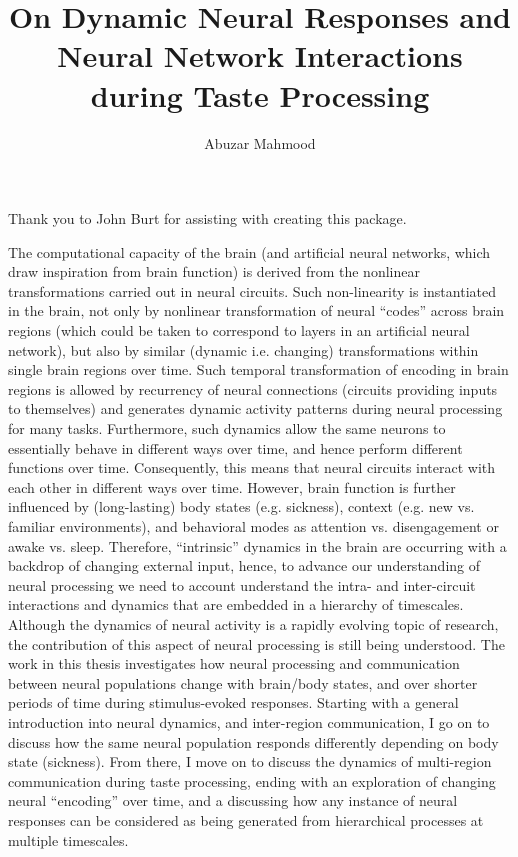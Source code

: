 \documentclass{brandeis-dissertation3.12}
\title{On Dynamic Neural Responses and Neural Network Interactions during Taste Processing}
\author{Abuzar Mahmood}
\begin{document}
\maketitlepage
\makeapproval
\makecopyright

\begin{dissertation-acknowledgements}
Thank you to John Burt for assisting with creating this package.
\end{dissertation-acknowledgements}

\begin{dissertation-abstract}
The computational capacity of the brain (and artificial neural networks, which draw inspiration from brain function) is derived from the nonlinear transformations carried out in neural circuits. Such non-linearity is instantiated in the brain, not only by nonlinear transformation of neural “codes” across brain regions (which could be taken to correspond to layers in an artificial neural network), but also by similar (dynamic i.e. changing) transformations within single brain regions over time. Such temporal transformation of encoding in brain regions is allowed by recurrency of neural connections (circuits providing inputs to themselves) and generates dynamic activity patterns during neural processing for many tasks. Furthermore, such dynamics allow the same neurons to essentially behave in different ways over time, and hence perform different functions over time. Consequently, this means that neural circuits interact with each other in different ways over time. However, brain function is further influenced by (long-lasting) body states (e.g. sickness), context (e.g. new vs. familiar environments), and behavioral modes as attention vs. disengagement or awake vs. sleep. Therefore, “intrinsic” dynamics in the brain are occurring with a backdrop of changing external input, hence, to advance our understanding of neural processing we need to account understand the intra- and inter-circuit interactions and dynamics that are embedded in a hierarchy of timescales. 
Although the dynamics of neural activity is a rapidly evolving topic of research, the contribution of this aspect of neural processing is still being understood. The work in this thesis investigates how neural processing and communication between neural populations change with brain/body states, and over shorter periods of time during stimulus-evoked responses. Starting with a general introduction into neural dynamics, and inter-region communication, I go on to discuss how the same neural population responds differently depending on body state (sickness). From there, I move on to discuss the dynamics of multi-region communication during taste processing, ending with an exploration of changing neural “encoding” over time, and a discussing how any instance of neural responses can be considered as being generated from hierarchical processes at multiple timescales.
\end{dissertation-abstract}

\doublespacing

\tableofcontents

\startbody






\end{document}
